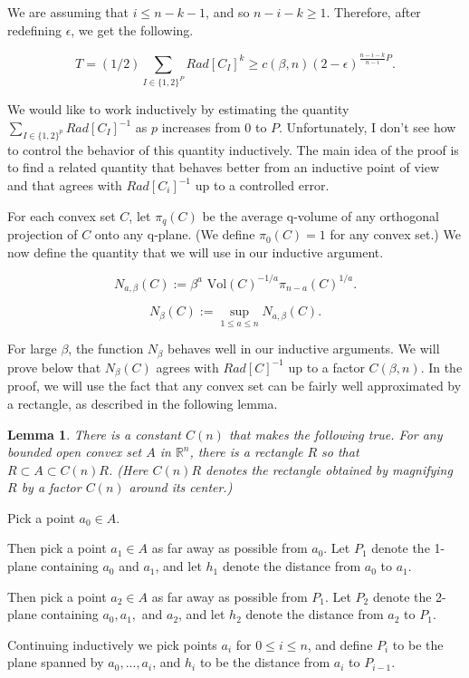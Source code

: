 \documentclass{amsart}
\newtheorem*{Theorem 1}{Theorem 1}
\newtheorem*{Theorem 2}{Theorem 2}
\newtheorem*{Theorem 1A}{Theorem 1A}
\newtheorem*{Theorem 2A}{Theorem 2A}
\newtheorem{lemma}{Lemma}[section]
\newtheorem*{vanishing lemma}{Vanishing Lemma}
\numberwithin{equation}{section}
\begin{document}
We are assuming that $i \le n-k-1$, and so $n-i-k \ge 1$. 
Therefore, after redefining $\epsilon$, we get the following.

$$T = (1/2) \sum_{I \in \{1, 2\}^P} Rad[C_I]^k \ge c(\beta, n)
(2-\epsilon)^{\frac{n-i-k}{n-i} P}.$$ \endproof

We would like to work inductively by estimating the quantity
$\sum_{I \in \{ 1, 2 \}^p} Rad[C_I]^{-1}$ as $p$ increases from
$0$ to $P$.  Unfortunately, I don't see how to control the
behavior of this quantity inductively.  The main idea of the
proof is to find a related quantity that behaves better from an
inductive point of view and that agrees with $Rad[C_i]^{-1}$ up
to a controlled error.

For each convex set $C$, let $\pi_q(C)$ be the average q-volume
of any orthogonal projection of $C$ onto any q-plane.  (We define
$\pi_0(C) = 1$ for any convex set.)  We now define the quantity
that we will use in our inductive argument.

$$N_{a, \beta}(C) := \beta^a \textrm{ Vol}(C)^{-1/a} \pi_{n-a}(C)^{1/a}.$$

$$N_\beta(C) := \sup_{1 \le a \le n} N_{a, \beta}(C).$$

For large $\beta$, the function $N_\beta$ behaves well in our inductive
arguments.
We will prove below that $N_\beta(C)$ agrees with $Rad[C]^{-1}$ up to a
factor $C(\beta, n)$.  In the proof, we will use the fact that
any convex set can be fairly well approximated by a rectangle, as
described in the following lemma.

\begin{lemma} There is a constant $C(n)$ that makes the following
true.  For any bounded open convex set $A$ in $\mathbb{R}^n$,
there is a rectangle $R$ so that $R \subset A \subset C(n) R$. 
(Here $C(n) R$ denotes the rectangle obtained by magnifying $R$
by a factor $C(n)$ around its center.)
\end{lemma}

\proof Pick a point $a_0 \in A$.

Then pick a point $a_1 \in A$ as far away as possible from $a_0$. 
Let $P_1$ denote the 1-plane containing $a_0$ and $a_1$, and let
$h_1$ denote the distance from $a_0$ to $a_1$.

Then pick a point $a_2 \in A$ as far away as possible from $P_1$. 
Let $P_2$ denote the 2-plane containing $a_0, a_1,$ and $a_2$,
and let $h_2$ denote the distance from $a_2$ to $P_1$.

Continuing inductively we pick points $a_i$ for $0 \le i \le n$,
and define $P_i$ to be the plane spanned by $a_0, ..., a_i$, and
$h_i$ to be the distance from $a_i$ to $P_{i-1}$. 
\end{document}
